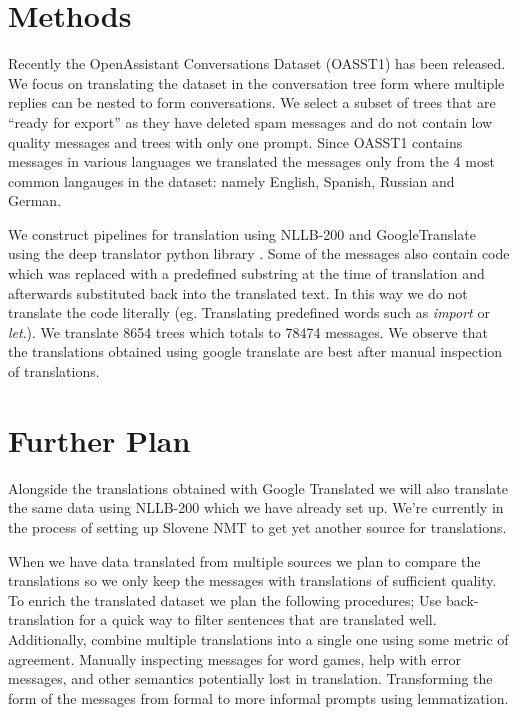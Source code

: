 \documentclass[fleqn,moreauthors,10pt]{ds_report}
\begin{document}
\section*{Methods}
    Recently the OpenAssistant Conversations Dataset (OASST1) has been released.
    We focus on translating the dataset in the conversation tree form where multiple replies can be nested to form conversations.
    We select a subset of trees that are ``ready for export'' as they have deleted spam messages and do not contain low quality messages and trees with only one prompt.
    Since OASST1 contains messages in various languages we translated the messages only from the 4 most common langauges in the dataset: namely English, Spanish, Russian and German.
    
    We construct pipelines for translation using NLLB-200 \cite{nllb2022} and GoogleTranslate \cite{google-translate} using the deep translator python library \cite{deep_transaltor}.
    Some of the messages also contain code which was replaced with a predefined substring at the time of translation and afterwards substituted back into the translated text.
    In this way we do not translate the code literally (eg. Translating predefined words such as \textit{import} or \textit{let}.).
    We translate 8654 trees which totals to 78474 messages.
    We observe that the translations obtained using google translate are best after manual inspection of translations.

    


\section*{Further Plan}
    Alongside the translations obtained with Google Translated we will also translate the same data using NLLB-200 which we have already set up.
    We're currently in the process of setting up Slovene NMT to get yet another source for translations.
    
    When we have data translated from multiple sources we plan to compare the translations so we only keep the messages with translations of sufficient quality.
    To enrich the translated dataset we plan the following procedures;
    Use back-translation for a quick way to filter sentences that are translated well. 
    Additionally, combine multiple translations into a single one using some metric of agreement. 
    Manually inspecting messages for word games, help with error messages, and other semantics potentially lost in translation.
    Transforming the form of the messages from formal to more informal prompts using lemmatization.
    
\end{document}
